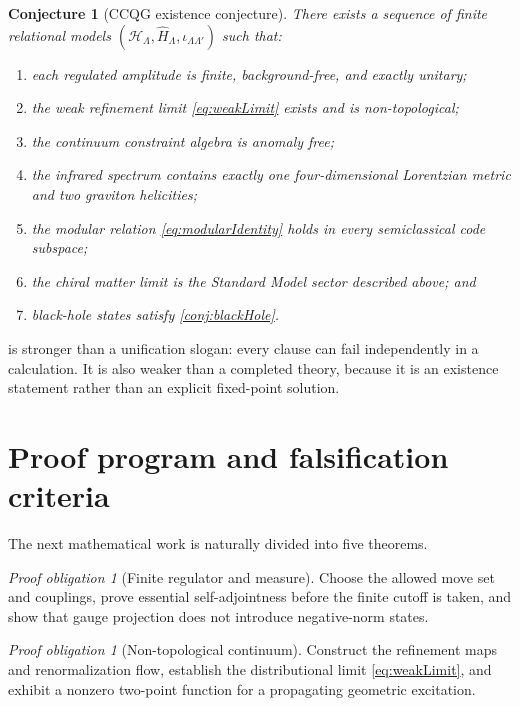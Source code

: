 \documentclass[11pt]{article}
\newtheorem{conjecture}[definition]{Conjecture}
\theoremstyle{remark}
\newtheorem{obligation}[definition]{Proof obligation}
\newcommand{\cH}{\mathcal H}
\begin{document}
\begin{conjecture}[CCQG existence conjecture]
There exists a sequence of finite relational models
\((\cH_\Lambda,\widehat H_\Lambda,\iota_{\Lambda\Lambda'})\) such that:
\begin{enumerate}[label=(\arabic*)]
  \item each regulated amplitude is finite, background-free, and exactly
        unitary;
  \item the weak refinement limit \eqref{eq:weakLimit} exists and is
        non-topological;
  \item the continuum constraint algebra is anomaly free;
  \item the infrared spectrum contains exactly one four-dimensional
        Lorentzian metric and two graviton helicities;
  \item the modular relation \eqref{eq:modularIdentity} holds in every
        semiclassical code subspace;
  \item the chiral matter limit is the Standard Model sector described
        above; and
  \item black-hole states satisfy
        \cref{conj:blackHole}.
\end{enumerate}
\label{conj:master}
\end{conjecture}

 is stronger than a unification slogan: every clause
can fail independently in a calculation.  It is also weaker than a
completed theory, because it is an existence statement rather than an
explicit fixed-point solution.

\section{Proof program and falsification criteria}

The next mathematical work is naturally divided into five theorems.

\begin{obligation}[Finite regulator and measure]
Choose the allowed move set and couplings, prove essential
self-adjointness before the finite cutoff is taken, and show that gauge
projection does not introduce negative-norm states.
\end{obligation}

\begin{obligation}[Non-topological continuum]
Construct the refinement maps and renormalization flow, establish the
distributional limit \eqref{eq:weakLimit}, and exhibit a nonzero
two-point function for a propagating geometric excitation.
\end{obligation}
\end{document}
